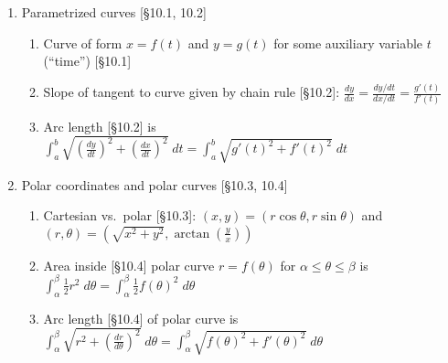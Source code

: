 \documentclass[11pt]{article}
\begin{document}
\begin{enumerate}
\item Parametrized curves [\S10.1, 10.2]
\begin{enumerate}
\item Curve of form $x=f(t)$ and $y=g(t)$ for some auxiliary variable $t$ (``time'') [\S10.1]
\item Slope of tangent to curve given by chain rule [\S10.2]: $\frac{dy}{dx} = \frac{dy/dt}{dx/dt} = \frac{g'(t)}{f'(t)}$ 
\item Arc length [\S10.2] is $\int_{a}^{b} \sqrt{(\frac{dy}{dt})^2 + (\frac{dx}{dt})^2} \; dt = \int_{a}^{b} \sqrt{g'(t)^2 + f'(t)^2} \; dt$
\end{enumerate}

\item Polar coordinates and polar curves [\S10.3, 10.4]
\begin{enumerate}
\item Cartesian vs.~polar [\S10.3]: $(x,y) = (r\cos \theta, r \sin \theta)$ and $(r,\theta) = (\sqrt{x^2+y^2}, \arctan (\frac{y}{x}))$
\item Area inside [\S10.4] polar curve $r=f(\theta)$ for $\alpha \leq \theta \leq \beta$ is $\int_{\alpha}^{\beta} \frac{1}{2} r^2 \; d\theta=\int_{\alpha}^{\beta} \frac{1}{2} f(\theta)^2 \; d\theta$ 
\item Arc length [\S10.4] of polar curve is $\int_{\alpha}^{\beta} \sqrt{r^2 + (\frac{dr}{d\theta})^2} \; d\theta = \int_{\alpha}^{\beta} \sqrt{f(\theta)^2 + f'(\theta)^2} \; d\theta$ 
\end{enumerate}


\end{enumerate}
\end{document}
